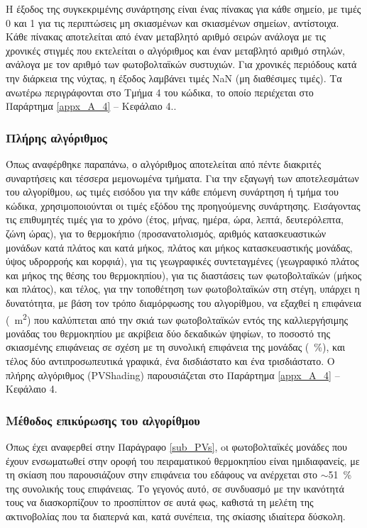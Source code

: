 \documentclass[12pt, a4paper]{report} %
\newcommand{\english}{\foreignlanguage{english}}
\begin{document}
Η έξοδος της συγκεκριμένης συνάρτησης είναι ένας πίνακας για κάθε σημείο, με τιμές 0 και 1 για τις περιπτώσεις μη σκιασμένων 
και σκιασμένων σημείων, αντίστοιχα. Κάθε πίνακας αποτελείται από έναν μεταβλητό αριθμό σειρών ανάλογα με τις χρονικές στιγμές 
που εκτελείται ο αλγόριθμος και έναν μεταβλητό αριθμό στηλών, ανάλογα με τον αριθμό των φωτοβολταϊκών συστυχιών. Για χρονικές 
περιόδους κατά την διάρκεια της νύχτας, η έξοδος λαμβάνει τιμές \english{NaN} (μη διαθέσιμες τιμές). Τα ανωτέρω περιγράφονται 
στο Τμήμα 4 του κώδικα, το οποίο περιέχεται στο Παράρτημα \ref{appx_A_4} – Κεφάλαιο 4..

\subsubsection{Πλήρης αλγόριθμος}\label{subsub_comlete_alg}

Όπως αναφέρθηκε παραπάνω, ο αλγόριθμος αποτελείται από πέντε διακριτές συναρτήσεις και τέσσερα μεμονωμένα τμήματα. Για την 
εξαγωγή των αποτελεσμάτων του αλγορίθμου, ως τιμές εισόδου για την κάθε επόμενη συνάρτηση ή τμήμα του κώδικα, χρησιμοποιούνται 
οι τιμές εξόδου της προηγούμενης συνάρτησης. Εισάγοντας τις επιθυμητές τιμές για το χρόνο (έτος, μήνας, ημέρα, ώρα, λεπτά, 
δευτερόλεπτα, ζώνη ώρας), για το θερμοκήπιο (προσανατολισμός, αριθμός κατασκευαστικών μονάδων κατά πλάτος και κατά μήκος, πλάτος 
και μήκος κατασκευαστικής μονάδας, ύψος υδρορροής και κορφιά), για τις γεωγραφικές συντεταγμένες (γεωγραφικό πλάτος και μήκος της 
θέσης του θερμοκηπίου), για τις διαστάσεις των φωτοβολταϊκών (μήκος και πλάτος),  και τέλος, για την τοποθέτηση των φωτοβολταϊκών 
στη στέγη, υπάρχει η δυνατότητα, με βάση τον τρόπο διαμόρφωσης του αλγορίθμου, να εξαχθεί η επιφάνεια (\SI{}{\meter\squared}) που 
καλύπτεται από την σκιά των φωτοβολταϊκών εντός της καλλιεργήσιμης μονάδας του θερμοκηπίου με ακρίβεια δύο δεκαδικών ψηφίων, το 
ποσοστό της σκιασμένης επιφάνειας σε σχέση με τη συνολική επιφάνεια της μονάδας (\SI{}{\percent}), και τέλος δύο αντιπροσωπευτικά 
γραφικά, ένα δισδιάστατο και ένα τρισδιάστατο. Ο πλήρης αλγόριθμος (\english{PVShading}) παρουσιάζεται στο Παράρτημα 
\ref{appx_A_4} – Κεφάλαιο 4.

\subsubsection{Μέθοδος επικύρωσης του αλγορίθμου}\label{subsub_validation}

Όπως έχει αναφερθεί στην Παράγραφο \ref{sub_PVs}, oι φωτοβολταϊκές μονάδες που έχουν ενσωματωθεί στην οροφή του πειραματικού 
θερμοκηπίου είναι ημιδιαφανείς, με τη σκίαση που παρουσιάζουν στην επιφάνεια του εδάφους να ανέρχεται στο $\sim$\SI{51}{\percent} 
της συνολικής τους επιφάνειας. Το γεγονός αυτό, σε συνδυασμό με την ικανότητά τους να διασκορπίζουν το προσπίπτον σε αυτά φως, 
καθιστά τη μελέτη της ακτινοβολίας που τα διαπερνά και, κατά συνέπεια, της σκίασης ιδιαίτερα δύσκολη.
\end{document}
